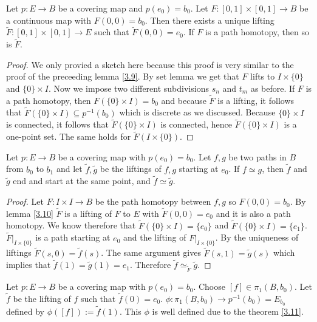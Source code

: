 \begin{lemma}\label{3.10}
    Let $p:E\to B$ be a covering map and $p(e_0)=b_0$. Let $F:[0,1]\times[0,1]\to B$ be a continuous map with $F(0,0)=b_0$.
    Then there exists a unique lifting $\tilde F:[0,1]\times [0,1]\to E$ such that $\tilde F(0,0)=e_0$. If $F$ is a path homotopy, then so is $\tilde F$.
\end{lemma}
\begin{proof}
    We only provied a sketch here because this proof is very similar to the proof of the preceeding lemma \ref{3.9}. By set lemma we get that $F$ lifts to $I\times \{0\}$ and $\{0\}\times I$.
    Now we impose two different subdivisions $s_n$ and $t_m$ as before. If $F$ is a path homotopy, then $F(\{0\}\times I)=b_0$ and because $\tilde F$ is a lifting, it follows that $\tilde F(\{0\}\times I)\subseteq p^{-1}(b_0)$ which is discrete as we discussed.
    Because $\{0\}\times I$ is connected, it follows that $\tilde F(\{0\}\times I)$ is connected, hence $\tilde F(\{0\}\times I)$ is a one-point set. The same holds for $\tilde F(I\times \{0\})$.
\end{proof}
\begin{theorem}\label{3.11}
    Let $p:E\to B$ be a covering map with $p(e_0)=b_0$.
    Let $f,g$ be two paths in $B$ from $b_0$ to $b_1$ and let $\tilde f,\tilde g$ be the liftings of $f,g$ starting at $e_0$.
    If $f\simeq g$, then $\tilde f$ and $\tilde g$ end and start at the same point, and $\tilde f\simeq\tilde g$.
\end{theorem}
\begin{proof}
    Let $F:I\times I\to B$ be the path homotopy between $f,g$ so $F(0,0)=b_0$. By lemma \ref{3.10} $\tilde F$ is a lifting of $F$ to $E$ with $\tilde F(0,0)=e_0$ and it is also a path homotopy.
    We know therefore that $\tilde F(\{0\}\times I)=\{e_0\}$ and $\tilde F(\{0\}\times I)=\{e_1\}$.
    $\tilde F|_{I\times \{0\}}$ is a path starting at $e_0$ and the lifting of $F|_{I\times \{0\}}$. By the uniqueness of liftings $\tilde F(s,0)=\tilde f(s)$.
    The same argument gives $\tilde F(s,1)=\tilde g(s)$ which implies that $\tilde f(1)=\tilde g(1)=e_1$. Therefore $\tilde f\simeq_{\tilde F}\tilde g$.
\end{proof}
\begin{definition}\label{3.12}
    Let $p:E\to B$ be a covering map with $p(e_0)=b_0$.
    Choose $[f]\in \pi_1(B,b_0)$. Let $\tilde f$ be the lifting of $f$ such that $\tilde f(0)=e_0$.
    $\phi:\pi_1(B,b_0)\to p^{-1}(b_0)=E_{b_0}$ defined by $\phi([f]):=\tilde f(1)$. This $\phi$ is well defined due to the theorem \ref{3.11}.
\end{definition}
